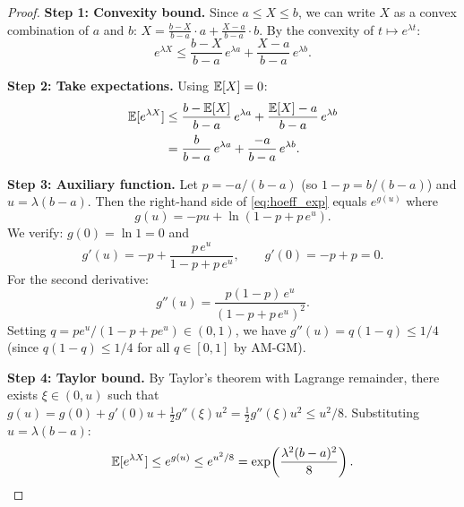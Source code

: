 \documentclass[11pt,a4paper]{article}
\begin{document}
\begin{proof}
\textbf{Step 1: Convexity bound.}
Since $a \leq X \leq b$, we can write $X$ as a convex
combination of $a$ and $b$:
$X = \frac{b - X}{b - a} \cdot a + \frac{X - a}{b - a} \cdot b$.
By the convexity of $t \mapsto e^{\lambda t}$:
\begin{equation}
  e^{\lambda X}
  \leq \frac{b - X}{b - a}\, e^{\lambda a}
    + \frac{X - a}{b - a}\, e^{\lambda b}.
  \label{eq:hoeff_convex}
\end{equation}

\textbf{Step 2: Take expectations.}
Using $\mathbb{E}[X] = 0$:
\begin{align}
  \mathbb{E}[e^{\lambda X}]
  &\leq \frac{b - \mathbb{E}[X]}{b - a}\, e^{\lambda a}
    + \frac{\mathbb{E}[X] - a}{b - a}\, e^{\lambda b}
  \nonumber\\
  &= \frac{b}{b - a}\, e^{\lambda a}
    + \frac{-a}{b - a}\, e^{\lambda b}.
  \label{eq:hoeff_exp}
\end{align}

\textbf{Step 3: Auxiliary function.}
Let $p = -a/(b - a)$ (so $1 - p = b/(b - a)$) and
$u = \lambda(b - a)$.  Then the right-hand side of
\eqref{eq:hoeff_exp} equals $e^{g(u)}$ where
\begin{equation}
  g(u) = -pu + \ln(1 - p + p\, e^u).
  \label{eq:hoeff_g}
\end{equation}
We verify: $g(0) = \ln 1 = 0$ and
\begin{equation}
  g'(u) = -p + \frac{p\, e^u}{1 - p + p\, e^u},
  \qquad g'(0) = -p + p = 0.
  \label{eq:hoeff_g_prime}
\end{equation}
For the second derivative:
\begin{equation}
  g''(u) = \frac{p(1-p)\, e^u}{(1 - p + p\, e^u)^2}.
  \label{eq:hoeff_g_double}
\end{equation}
Setting $q = p e^u / (1 - p + p e^u) \in (0,1)$, we have
$g''(u) = q(1-q) \leq 1/4$ (since $q(1-q) \leq 1/4$ for all
$q \in [0,1]$ by AM-GM).

\textbf{Step 4: Taylor bound.}
By Taylor's theorem with Lagrange remainder, there exists
$\xi \in (0, u)$ such that
$g(u) = g(0) + g'(0)u + \tfrac{1}{2} g''(\xi) u^2
= \tfrac{1}{2} g''(\xi) u^2 \leq u^2/8$.
Substituting $u = \lambda(b-a)$:
\begin{equation}
  \mathbb{E}[e^{\lambda X}]
  \leq e^{g(u)} \leq e^{u^2/8}
  = \exp\!\left(\frac{\lambda^2(b-a)^2}{8}\right). \qedhere
  \label{eq:hoeff_final}
\end{equation}
\end{proof}
\end{document}
